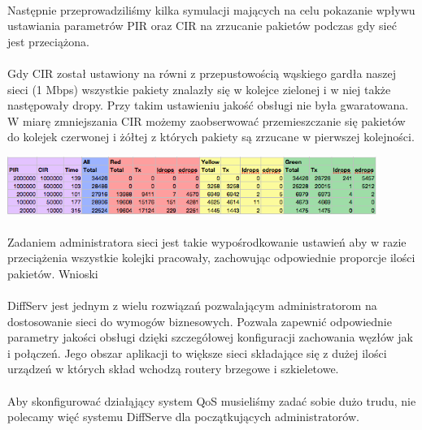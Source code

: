\documentclass[a4paper]{article}
\begin{document}
\paragraph{}
Następnie przeprowadziliśmy kilka symulacji mających na celu pokazanie wpływu ustawiania parametrów PIR oraz CIR na zrzucanie pakietów podczas gdy sieć jest przeciążona.

\paragraph{}
Gdy CIR został ustawiony na równi z przepustowością wąskiego gardła naszej sieci (1 Mbps) wszystkie pakiety znalazły się w kolejce zielonej i w niej także następowały dropy. Przy takim ustawieniu jakość obsługi nie była gwaratowana.
W miarę zmniejszania CIR możemy zaobserwować przemieszczanie się pakietów do kolejek czerwonej i żółtej z których pakiety są zrzucane w pierwszej kolejności.



\includegraphics[width=120mm]{images/punkt_3_tabela.png}

\paragraph{}
Zadaniem administratora sieci jest takie wypośrodkowanie ustawień aby w razie przeciążenia wszystkie kolejki pracowały, zachowując odpowiednie proporcje ilości pakietów.
Wnioski

\paragraph{}
DiffServ jest jednym z wielu rozwiązań pozwalającym administratorom na dostosowanie sieci do wymogów biznesowych. Pozwala zapewnić odpowiednie parametry jakości obsługi dzięki szczegółowej konfiguracji zachowania węzłów jak i połączeń. Jego obszar aplikacji to większe sieci składające się z dużej ilości urządzeń w których skład wchodzą routery brzegowe i szkieletowe.

\paragraph{}
Aby skonfigurować działąjący system QoS musieliśmy zadać sobie dużo trudu, nie polecamy więć systemu DiffServe dla początkujących administratorów.
\end{document}
